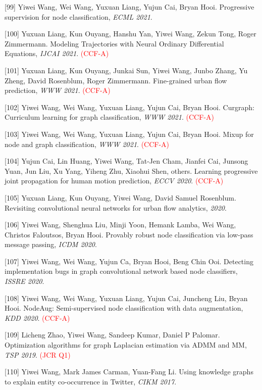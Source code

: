[99] Yiwei Wang, Wei Wang, Yuxuan Liang, Yujun Cai, Bryan Hooi. Progressive supervision for node classification, \textit{ECML 2021}.

[100] Yuxuan Liang, Kun Ouyang, Hanshu Yan, Yiwei Wang, Zekun Tong, Roger Zimmermann. Modeling Trajectories with Neural Ordinary Differential Equations, \textit{IJCAI 2021}. \textcolor{red}{(CCF-A)}

[101] Yuxuan Liang, Kun Ouyang, Junkai Sun, Yiwei Wang, Junbo Zhang, Yu Zheng, David Rosenblum, Roger Zimmermann. Fine-grained urban flow prediction, \textit{WWW 2021}. \textcolor{red}{(CCF-A)}

[102] Yiwei Wang, Wei Wang, Yuxuan Liang, Yujun Cai, Bryan Hooi. Curgraph: Curriculum learning for graph classification, \textit{WWW 2021}. \textcolor{red}{(CCF-A)}

[103] Yiwei Wang, Wei Wang, Yuxuan Liang, Yujun Cai, Bryan Hooi. Mixup for node and graph classification, \textit{WWW 2021}. \textcolor{red}{(CCF-A)}

[104] Yujun Cai, Lin Huang, Yiwei Wang, Tat-Jen Cham, Jianfei Cai, Junsong Yuan, Jun Liu, Xu Yang, Yiheng Zhu, Xiaohui Shen, others. Learning progressive joint propagation for human motion prediction, \textit{ECCV 2020}. \textcolor{red}{(CCF-A)}

[105] Yuxuan Liang, Kun Ouyang, Yiwei Wang, David Samuel Rosenblum. Revisiting convolutional neural networks for urban flow analytics, \textit{ 2020}.

[106] Yiwei Wang, Shenghua Liu, Minji Yoon, Hemank Lamba, Wei Wang, Christos Faloutsos, Bryan Hooi. Provably robust node classification via low-pass message passing, \textit{ICDM 2020}.

[107] Yiwei Wang, Wei Wang, Yujun Ca, Bryan Hooi, Beng Chin Ooi. Detecting implementation bugs in graph convolutional network based node classifiers, \textit{ISSRE 2020}.

[108] Yiwei Wang, Wei Wang, Yuxuan Liang, Yujun Cai, Juncheng Liu, Bryan Hooi. NodeAug: Semi-supervised node classification with data augmentation, \textit{KDD 2020}. \textcolor{red}{(CCF-A)}

[109] Licheng Zhao, Yiwei Wang, Sandeep Kumar, Daniel P Palomar. Optimization algorithms for graph Laplacian estimation via ADMM and MM, \textit{TSP 2019}. \textcolor{red}{(JCR Q1)}

[110] Yiwei Wang, Mark James Carman, Yuan-Fang Li. Using knowledge graphs to explain entity co-occurrence in Twitter, \textit{CIKM 2017}.
